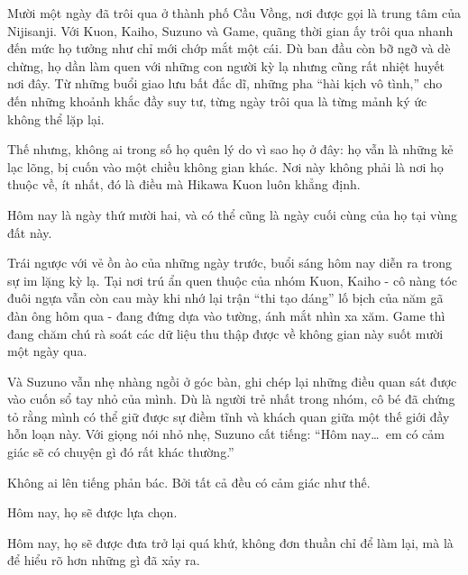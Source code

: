 \documentclass[../main.tex]{subfiles}
\begin{document}

Mười một ngày đã trôi qua ở thành phố Cầu Vồng, nơi được gọi là trung tâm của Nijisanji. Với Kuon, Kaiho, Suzuno và Game, quãng thời gian ấy trôi qua nhanh đến mức họ tưởng như chỉ mới chớp mắt một cái. Dù ban đầu còn bỡ ngỡ và dè chừng, họ dần làm quen với những con người kỳ lạ nhưng cũng rất nhiệt huyết nơi đây. Từ những buổi giao lưu bất đắc dĩ, những pha ``hài kịch vô tình,'' cho đến những khoảnh khắc đầy suy tư, từng ngày trôi qua là từng mảnh ký ức không thể lặp lại.

Thế nhưng, không ai trong số họ quên lý do vì sao họ ở đây: họ vẫn là những kẻ lạc lõng, bị cuốn vào một chiều không gian khác. Nơi này không phải là nơi họ thuộc về, ít nhất, đó là điều mà Hikawa Kuon luôn khẳng định.

Hôm nay là ngày thứ mười hai, và có thể cũng là ngày cuối cùng của họ tại vùng đất này.

Trái ngược với vẻ ồn ào của những ngày trước, buổi sáng hôm nay diễn ra trong sự im lặng kỳ lạ. Tại nơi trú ẩn quen thuộc của nhóm Kuon, Kaiho - cô nàng tóc đuôi ngựa vẫn còn cau mày khi nhớ lại trận ``thi tạo dáng'' lố bịch của năm gã đàn ông hôm qua - đang đứng dựa vào tường, ánh mắt nhìn xa xăm. Game thì đang chăm chú rà soát các dữ liệu thu thập được về không gian này suốt mười một ngày qua.

Và Suzuno vẫn nhẹ nhàng ngồi ở góc bàn, ghi chép lại những điều quan sát được vào cuốn sổ tay nhỏ của mình. Dù là người trẻ nhất trong nhóm, cô bé đã chứng tỏ rằng mình có thể giữ được sự điềm tĩnh và khách quan giữa một thế giới đầy hỗn loạn này. Với giọng nói nhỏ nhẹ, Suzuno cất tiếng: ``Hôm nay\dots\ em có cảm giác sẽ có chuyện gì đó rất khác thường.''

Không ai lên tiếng phản bác. Bởi tất cả đều có cảm giác như thế.

Hôm nay, họ sẽ được lựa chọn.

Hôm nay, họ sẽ được đưa trở lại quá khứ, không đơn thuần chỉ để làm lại, mà là để hiểu rõ hơn những gì đã xảy ra.
\end{document}
